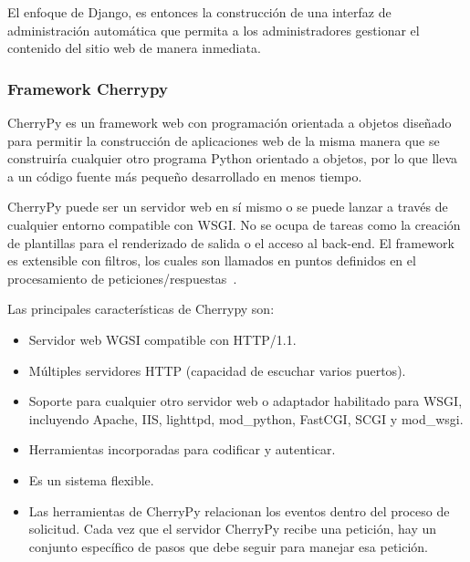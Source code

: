 \documentclass[a4paper]{article}
\begin{document}
El enfoque de Django, es entonces la construcción de una interfaz de administración automática que permita a los administradores gestionar el contenido del sitio web de manera inmediata.

\subsubsection{Framework Cherrypy}\label{sub:cherrypy}
CherryPy es un framework web con programación orientada a objetos diseñado para permitir la construcción de aplicaciones web de la misma manera que se construiría cualquier otro programa Python orientado a objetos, por lo que lleva a un código fuente más pequeño desarrollado en menos tiempo.

CherryPy puede ser un servidor web en sí mismo o se puede lanzar a través de cualquier entorno compatible con WSGI. No se ocupa de tareas como la creación de plantillas para el renderizado de salida o el acceso al back-end. El framework es extensible con filtros, los cuales son llamados en puntos definidos en el procesamiento de peticiones/respuestas~\citep{Cherrypy}.

Las principales características de Cherrypy son:

\begin{itemize}
	\item Servidor web WGSI compatible con HTTP/1.1.
	\item Múltiples servidores HTTP (capacidad de escuchar varios puertos).
	\item Soporte para cualquier otro servidor web o adaptador habilitado para WSGI, incluyendo Apache, 	IIS, lighttpd, mod\_python, FastCGI, SCGI y mod\_wsgi.
	\item Herramientas incorporadas para codificar y autenticar.
	\item Es un sistema flexible.
	\item Las herramientas de CherryPy relacionan los eventos dentro del proceso de solicitud. Cada vez que el servidor CherryPy recibe una petición, hay un conjunto específico de pasos que debe seguir para manejar esa petición.
\end{itemize}
\end{document}
